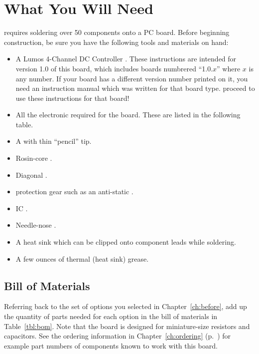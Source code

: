 \documentclass[letterpaper,twoside,onecolumn,openright,final]{memoir}
\begin{document}
\chapter{What You Will Need}\label{ch:materials}
 requires soldering over 50 components onto a PC board.
Before beginning construction, be sure you have the following tools and materials on hand:
\begin{itemize}
	\item A Lumos 4-Channel DC Controller . 
		These instructions are intended for version
		1.0 of this board, which includes boards numbrered ``1.0.$x$'' where $x$ is any
		number.  If your board has a different version number printed on it, you need an
		instruction manual which was written for that board type.   proceed to
		use these instructions for that board!
	\item All the electronic  required for the board.  These are listed in the
		following table.
	\item A  with thin ``pencil'' tip.
	\item Rosin-core .  
	\item Diagonal .
	\item {} protection gear such as an anti-static .
	\item IC .
	\item Needle-nose .
	\item A heat sink which can be clipped onto component leads while soldering.
	\item A few ounces of thermal (heat sink) grease.
\end{itemize}

\section{Bill of Materials}
Referring back to the set of options you selected in Chapter~\ref{ch:before}, add up the quantity of
parts needed for each option in the bill of materials in Table~\ref{tbl:bom}.
Note that the board is designed for miniature-size resistors and capacitors.  See the
ordering information in Chapter~\ref{ch:ordering} (p.~\pageref{ch:ordering}) for example part numbers of
components known to work with this board.
\end{document}
